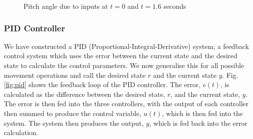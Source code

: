 \documentclass[12pt]{article}
\begin{document}
\begin{figure}[ht]
    \centering
    \caption{Pitch angle due to inputs at $t = 0$ and $t = 1.6$ seconds}
    \label{fig:pitch-angle6}
\end{figure}

\subsubsection{PID Controller}

We have constructed a PID (Proportional-Integral-Derivative) system; a feedback control system which uses the error between the current state and the desired state to calculate the control parameters. We now generalise this for all possible movement operations and call the desired state $r$ and the current state $y$. Fig. \ref{fig:pid} shows the feedback loop of the PID controller. The error, $e(t)$, is calculated as the difference between the desired state, $r$, and the current state, $y$. The error is then fed into the three controllers, with the output of each controller then summed to produce the control variable, $u(t)$, which is then fed into the system. The system then produces the output, $y$, which is fed back into the error calculation.
\end{document}
